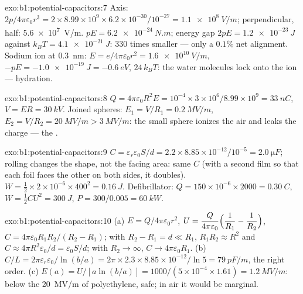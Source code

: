 \begin{solution}{exo:b1:potential-capacitors:7}
Axis: $2p/4\pi\varepsilon_0r^3 = 2 \times 8.99 \times 10^9 \times 6.2 \times 10^{-30}/10^{-27} =
\qty{1.1e8}{V/m}$; perpendicular, half: \qty{5.6e7}{V/m}.  $pE =
\qty{6.2e-24}{N.m}$; energy gap $2pE = \qty{1.2e-23}{J}$ against $k_BT =
\qty{4.1e-21}{J}$: $330$ times smaller --- only a $0.1\%$ net alignment.
Sodium ion at \qty{0.3}{nm}: $E = e/4\pi\varepsilon_0r^2 = \qty{1.6e10}{V/m}$, $-pE
= \qty{-1.0e-19}{J} = \qty{-0.6}{eV}$, $24\,k_BT$: the water molecules lock
onto the ion --- hydration.
\end{solution}

\begin{solution}{exo:b1:potential-capacitors:8}
$Q = 4\pi\varepsilon_0R^2E = 10^{-4} \times 3 \times 10^6/8.99 \times 10^9 = \qty{33}{nC}$,
$V = ER = \qty{30}{kV}$. Joined spheres: $E_1 = V/R_1 = \qty{0.2}{MV/m}$,
$E_2 = V/R_2 = \qty{20}{MV/m} > \qty{3}{MV/m}$: the small sphere ionizes the
air and leaks the charge --- the .
\end{solution}

\begin{solution}{exo:b1:potential-capacitors:9}
$C = \varepsilon_r\varepsilon_0S/d = 2.2 \times 8.85 \times 10^{-12}/10^{-5} = \qty{2.0}{\micro F}$;
rolling changes the shape, not the facing area: same $C$ (with a second
film so that each foil faces the other on both sides, it doubles).
$W = \tfrac12 \times 2 \times 10^{-6} \times 400^2 = \qty{0.16}{J}$. Defibrillator:
$Q = 150 \times 10^{-6} \times 2000 = \qty{0.30}{C}$, $W = \tfrac12CU^2 = \qty{300}{J}$,
$P = 300/0.005 = \qty{60}{kW}$.
\end{solution}

\begin{solution}{exo:b1:potential-capacitors:10}
(a) $E = Q/4\pi\varepsilon_0r^2$, $U = \dfrac{Q}{4\pi\varepsilon_0}\Bigl(\dfrac1{R_1} -
\dfrac1{R_2}\Bigr)$, $C = 4\pi\varepsilon_0R_1R_2/(R_2 - R_1)$; with $R_2 - R_1 = d \ll
R_1$, $R_1R_2 \approx R^2$ and $C \approx 4\pi R^2\varepsilon_0/d = \varepsilon_0S/d$; with $R_2 \to
\infty$, $C \to 4\pi\varepsilon_0R_1$. (b) $C/L = 2\pi\varepsilon_r\varepsilon_0/\ln(b/a) = 2\pi \times 2.3
\times 8.85 \times 10^{-12}/\ln5 = \qty{79}{pF/m}$, the right order. (c) $E(a) =
U/[a\ln(b/a)] = 1000/(5 \times 10^{-4} \times 1.61) = \qty{1.2}{MV/m}$: below the
\qty{20}{MV/m} of polyethylene, safe; in air it would be marginal.
\end{solution}

